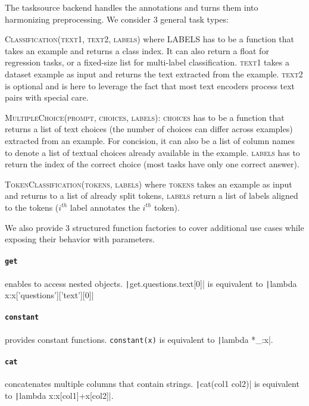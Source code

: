 \documentclass[11pt]{article}
\begin{document}
The tasksource backend handles the annotations and turns them into harmonizing preprocessing. We consider 3 general task types:

\textsc{Classification(text1, text2, labels)} where \textsc{LABELS} has to be a function that takes an example and returns a class index. It can also return a float for regression tasks, or a fixed-size list for multi-label classification. 
\textsc{text1} takes a dataset example as input and returns the text extracted from the example.
\textsc{text2} is optional and is here to leverage the fact that most text encoders process text pairs with special care.


\textsc{MultipleChoice(prompt, 
choices, labels)}:
\textsc{choices} has to be a function that returns a list of text choices (the number of choices can differ across examples) extracted from an example. For concision, it can also be a list of column names to denote a list of textual choices already available in the example.  \textsc{labels} has to return the index of the correct choice (most tasks have only one correct answer).

\textsc{TokenClassification(tokens, labels)} where \textsc{tokens} takes an example as input and returns to a list of already split tokens,  \textsc{labels} return a list of labels aligned to the tokens ($i^{th}$ label annotates the $i^{th}$ token).



We also provide 3 structured function factories to cover additional use cases while exposing their behavior with parameters.

 \paragraph{\texttt{get}} enables to access nested objects. \texttt|get.questions.text[0]| is equivalent to \texttt|lambda x:x['questions']['text'][0]|

\paragraph{\texttt{constant}} provides constant functions. \texttt{constant(x)} is equivalent to \texttt|lambda *_:x|.

\paragraph{\texttt{cat}} concatenates multiple columns that contain strings. \texttt|cat(col1 col2)| is equivalent to \texttt|lambda x:x[col1]+x[col2]|.
\end{document}
